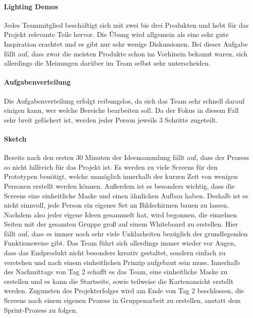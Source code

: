 \paragraph{Lighting Demos}
%
Jedes Teammitglied beschäftigt sich mit zwei bis drei Produkten und hebt für das Projekt relevante Teile hervor. Die Übung wird allgemein als eine sehr gute Inspiration erachtet und es gibt nur sehr wenige Diskussionen. 
Bei dieser Aufgabe fällt auf, dass zwar die meisten Produkte schon im Vorhinein bekannt waren, sich allerdings die Meinungen darüber im Team selbst sehr unterscheiden.

\paragraph{Aufgabenverteilung}
Die Aufgabenverteilung erfolgt reibungslos, da sich das Team sehr schnell darauf einigen kann, wer welche Bereiche bearbeiten soll. Da der Fokus in diesem Fall sehr breit gefächert ist, werden jeder Person jeweils 3 Schritte zugeteilt.

\paragraph{Sketch}
Bereits nach den ersten 30 Minuten der Ideensammlung fällt auf, dass der Prozess so nicht hilfreich für das Projekt ist. Es werden zu viele Screens für den Prototypen benötigt, welche unmöglich innerhalb der kurzen Zeit von wenigen Personen erstellt werden können. Außerdem ist es besonders wichtig, dass die Screens eine einheitliche Maske und einen ähnlichen Aufbau haben. Deshalb ist es nicht sinnvoll, jede Person ein eigenes Set an Bildschirmen bauen zu lassen. Nachdem also jeder eigene Ideen gesammelt hat, wird begonnen, die einzelnen Seiten mit der gesamten Gruppe groß auf einem Whiteboard zu erstellen. Hier fällt auf, dass es immer noch sehr viele Unklarheiten bezüglich der grundlegenden Funktionsweise gibt. Das Team führt sich allerdings immer wieder vor Augen, dass das Endprodukt nicht besonders kreativ gestaltet, sondern einfach zu verstehen und nach einem einheitlichen Prinzip aufgebaut sein muss. Innerhalb des Nachmittags von Tag 2 schafft es das Team, eine einheitliche Maske zu erstellen und es kann die Startseite, sowie teilweise die Kartenansicht erstellt werden.
Zugunsten des Projekterfolges wird am Ende von Tag 2 beschlossen, die Screens nach einem eigenen Prozess in Gruppenarbeit zu erstellen, anstatt dem Sprint-Prozess zu folgen.

